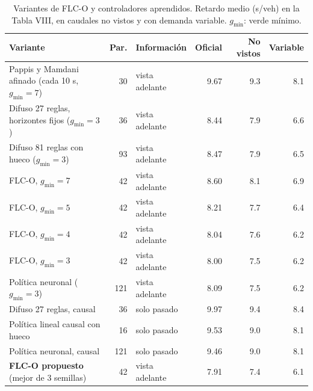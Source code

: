 \begin{table}[t]
\centering
\caption{Variantes de FLC-O y controladores aprendidos. Retardo medio (s/veh) en la Tabla VIII, en caudales no vistos y con demanda variable. $g_{\min}$: verde m\'inimo.}
\label{tab:ablacion}
\scriptsize
\setlength{\tabcolsep}{2.4pt}
\begin{tabular}{@{}lrlrrr@{}}
\toprule
Variante & Par. & Informaci\'on & Oficial & No vistos & Variable \\
\midrule
Pappis y Mamdani afinado (cada 10 s, $g_{\min}=7$) & 30 & vista adelante & 9.67 & 9.3 & 8.1 \\
Difuso 27 reglas, horizontes fijos ($g_{\min}=3$) & 36 & vista adelante & 8.44 & 7.9 & 6.6 \\
Difuso 81 reglas con hueco ($g_{\min}=3$) & 93 & vista adelante & 8.47 & 7.9 & 6.5 \\
FLC-O, $g_{\min}=7$ & 42 & vista adelante & 8.60 & 8.1 & 6.9 \\
FLC-O, $g_{\min}=5$ & 42 & vista adelante & 8.21 & 7.7 & 6.4 \\
FLC-O, $g_{\min}=4$ & 42 & vista adelante & 8.04 & 7.6 & 6.2 \\
FLC-O, $g_{\min}=3$ & 42 & vista adelante & 8.00 & 7.5 & 6.2 \\
Política neuronal ($g_{\min}=3$) & 121 & vista adelante & 8.09 & 7.5 & 6.2 \\
Difuso 27 reglas, causal & 36 & solo pasado & 9.97 & 9.4 & 8.4 \\
Política lineal causal con hueco & 16 & solo pasado & 9.53 & 9.0 & 8.1 \\
Política neuronal, causal & 121 & solo pasado & 9.46 & 9.0 & 8.1 \\
\textbf{FLC-O propuesto} (mejor de 3 semillas) & 42 & vista adelante & 7.91 & 7.4 & 6.1 \\
\bottomrule
\end{tabular}
\end{table}
